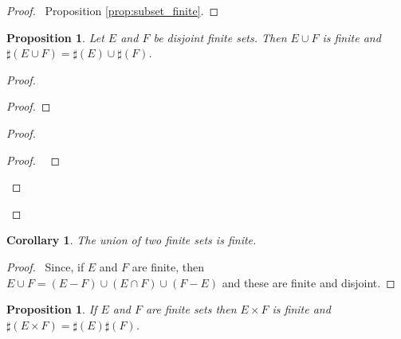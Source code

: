 \documentclass{report}
\let\qed\relax
\newtheorem{prop}[ax]{Proposition}
\newtheorem{cor}{Corollary}[ax]
\theoremstyle{definition}
\begin{document}
\begin{proof}
\pf\ Proposition \ref{prop:subset_finite}. \qed
\end{proof}

\begin{prop}
\label{prop:size_of_union}
Let $E$ and $F$ be disjoint finite sets. Then $E \cup F$ is finite and $\sharp(E \cup F) = \sharp(E) \cup \sharp(F)$.
\end{prop}

\begin{proof}
\pf
{}
\begin{proof}
\end{proof}
\begin{proof}
	\begin{proof}
		\pf\ 
	\end{proof}
\end{proof}
\qed
\end{proof}

\begin{cor}
\label{cor:union_finite}
The union of two finite sets is finite.
\end{cor}

\begin{proof}
\pf\ Since, if $E$ and $F$ are finite, then $E \cup F = (E - F) \cup (E \cap F) \cup (F - E)$ and these are finite and disjoint. \qed
\end{proof}

\begin{prop}
\label{prop:size_product}
If $E$ and $F$ are finite sets then $E \times F$ is finite and $\sharp(E \times F) = \sharp(E) \sharp(F)$.
\end{prop}
\end{document}
